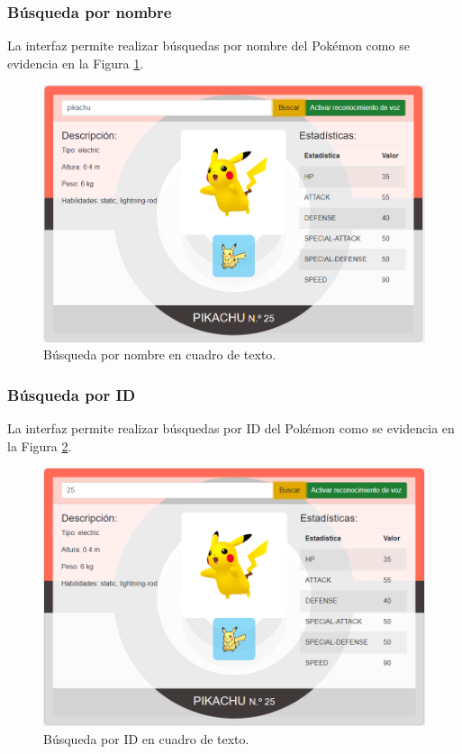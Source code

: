 \documentclass[conference]{IEEEtran}
\begin{document}
\subsubsection{Búsqueda por nombre}
La interfaz permite realizar búsquedas por nombre del Pokémon como se evidencia en la Figura \ref{fig:busqueda-nombre}.
\begin{figure}[H]
    \centering
    \includegraphics[width=0.8\columnwidth]{Busqueda-nombre.png}
    \caption{Búsqueda por nombre en cuadro de texto.}
    \label{fig:busqueda-nombre}
\end{figure}

\subsubsection{Búsqueda por ID}
La interfaz permite realizar búsquedas por ID del Pokémon como se evidencia en la Figura \ref{fig:busqueda-id}.
\begin{figure}[H]
    \centering
    \includegraphics[width=0.8\columnwidth]{Busqueda-id.png}
    \caption{Búsqueda por ID en cuadro de texto.}
    \label{fig:busqueda-id}
\end{figure}
\end{document}
